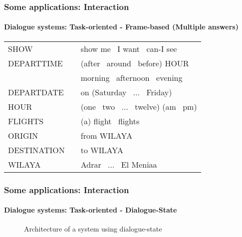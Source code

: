 \documentclass[xcolor=table]{beamer}
\begin{document}
\begin{frame}
	\frametitle{Some applications: Interaction}
	\framesubtitle{Dialogue systems: Task-oriented - Frame-based (Multiple answers)}
	
		\centering\footnotesize
		\begin{tabular}{lll}
			SHOW & \textrightarrow & show me \textbar\ I want \textbar\ can-I see \\
			DEPARTTIME & \textrightarrow & (after \textbar\ around \textbar\ before) HOUR \textbar\\
			&  & morning \textbar\ afternoon \textbar\ evening\\
			DEPARTDATE & \textrightarrow & on (Saturday \textbar\ ... \textbar\ Friday)\\
			HOUR & \textrightarrow & (one \textbar\ two \textbar\ ... \textbar\ twelve) (am \textbar\ pm) \\
			FLIGHTS & \textrightarrow & (a) flight \textbar\ flights \\
			ORIGIN & \textrightarrow & from WILAYA \\
			DESTINATION & \textrightarrow & to WILAYA \\
			WILAYA & \textrightarrow & Adrar \textbar\ ... \textbar\ El Meniaa \\
		\end{tabular}
		
	
\end{frame}

\begin{frame}
	\frametitle{Some applications: Interaction}
	\framesubtitle{Dialogue systems: Task-oriented - Dialogue-State}
	
	\begin{figure}
		\centering
		\caption{Architecture of a system using dialogue-state \cite{2016-williams-al}}
	\end{figure}
	
\end{frame}
\end{document}
